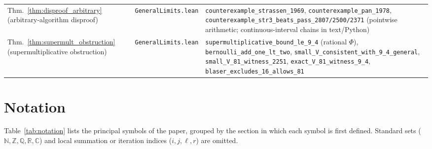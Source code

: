 \documentclass[11pt,a4paper]{article}
\theoremstyle{plain}
\theoremstyle{definition}
\theoremstyle{remark}
\newcommand{\N}{\mathbb{N}}
\newcommand{\Z}{\mathbb{Z}}
\newcommand{\Q}{\mathbb{Q}}
\newcommand{\R}{\mathbb{R}}
\newcommand{\C}{\mathbb{C}}
\begin{document}
\begin{landscape}
\begin{table}[!htbp]
\begin{tabular}{@{} >{\raggedright\arraybackslash}p{6.0cm} l >{\raggedright\arraybackslash}p{13.4cm} @{}}
Thm.~\ref{thm:disproof_arbitrary} (arbitrary-algorithm disproof) & \texttt{GeneralLimits.lean} & \texttt{counterexample\_strassen\_1969}, \texttt{counterexample\_pan\_1978}, \texttt{counterexample\_str3\_beats\_pass\_2807/2500/2371} (pointwise arithmetic; continuous-interval chains in text/Python) \\
Thm.~\ref{thm:supermult_obstruction} (supermultiplicative obstruction) & \texttt{GeneralLimits.lean} & \texttt{supermultiplicative\_bound\_le\_9\_4} (rational $\Phi$), \texttt{bernoulli\_add\_one\_lt\_two}, \texttt{small\_V\_consistent\_with\_9\_4\_general}, \texttt{small\_V\_81\_witness\_2251}, \texttt{exact\_V\_81\_witness\_9\_4}, \texttt{blaser\_excludes\_16\_allows\_81} \\
\bottomrule
\end{tabular}
\end{table}

\clearpage

\section{Notation}
\label{app:notation}

Table~\ref{tab:notation} lists the principal symbols of the paper, grouped by the section in which each symbol is first defined. Standard sets ($\N, \Z, \Q, \R, \C$) and local summation or iteration indices ($i, j, \ell, r$) are omitted.


\end{landscape}
\end{document}
